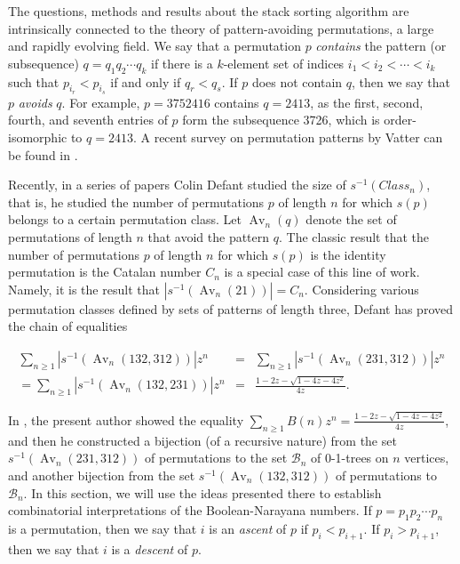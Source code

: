\documentclass[11pt]{article}
\newcommand{\av}{\operatorname{Av}}
\begin{document}
The questions, methods and results about the stack sorting algorithm are intrinsically connected to the theory of pattern-avoiding permutations, a large and rapidly evolving field. 
 We say that a permutation $p$ {\em contains} the pattern (or subsequence) $q=q_1q_2\cdots q_k$ 
if there is a $k$-element set of indices $i_1<i_2< \cdots <i_k$ such that $p_{i_r} < p_{i_s} $ if and only
if $q_r<q_s$.  If $p$ does not contain $q$, then we say that $p$ {\em avoids} $q$. For example, $p=3752416$ contains
$q=2413$, as the first, second, fourth, and seventh entries of $p$ form the subsequence 3726, which is order-isomorphic
to $q=2413$.  A recent survey on permutation 
patterns by Vatter can be found in \cite{vatter}.


Recently, in a series of papers \cite{aust,lothar,enum} Colin Defant studied the size of $s^{-1}(Class_n)$, that is, he studied the number of permutations $p$ of length $n$
for which $s(p)$ belongs to a certain permutation class.  Let $\av_n(q)$ denote the set of permutations of length $n$ that avoid the pattern $q$. The classic result that the number
of permutations $p$ of length $n$ for which $s(p)$ is the identity permutation is the Catalan number $C_n$  is a special case of this line of work.  Namely, it is the result that
$|s^{-1}(\av_n(21))|=C_n$. Considering various permutation classes defined by sets of patterns of length three,  Defant has proved the chain
of equalities

\begin{eqnarray*}\sum_{n\geq 1} |s^{-1}(\av_n(132,312))| z^n & = &  \sum_{n\geq 1} |s^{-1}(\av_n(231,312))| z^n \\ = \sum_{n\geq 1} |s^{-1}(\av_n(132,231))|z^n 
& = & \frac{1-2z-\sqrt{1-4z-4z^2}}{4z} .\end{eqnarray*}

In \cite{01trees}, the present author showed the equality $\sum_{n\geq 1}B(n)z^n =  \frac{1-2z-\sqrt{1-4z-4z^2}}{4z}$, and then
he constructed a bijection (of a recursive nature) from the set   $s^{-1}(\av_n(231,312))$ of permutations to the set $\mathcal B_n$ of 0-1-trees on $n$ vertices, and another bijection from the 
set $s^{-1}(\av_n(132,312))$ of permutations to $\mathcal B_n$. In this section, we will use the ideas presented there to establish combinatorial interpretations of the
Boolean-Narayana numbers.  If $p=p_1p_2\cdots p_n$ is a permutation, then we say that $i$ is an {\em ascent} of $p$ if $p_i<p_{i+1}$. If $p_i > p_{i+1}$, then we say that 
$i$ is a {\em descent} of $p$. 
\end{document}
